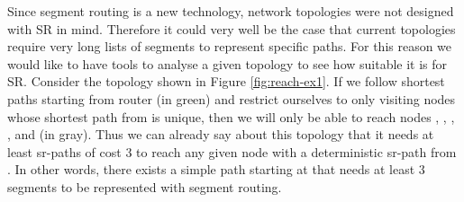 Since segment routing is a new technology, network topologies were not designed with SR in mind.
Therefore it could very well be the case that current topologies require very long lists of segments
to represent specific paths. For this reason we would like to have tools to analyse
a given topology to see how suitable it is for SR. Consider the topology shown in Figure \ref{fig:reach-ex1}.
If we follow shortest paths starting from router  (in green) and restrict ourselves to only visiting nodes
whose shortest path from  is unique, then we will only be able to reach nodes , ,
, ,  and  (in gray). Thus we can already say about this topology that
it needs at least sr-paths of cost $3$ to reach any given node with a deterministic sr-path from .
In other words, there exists a simple path starting at  that needs at least $3$ segments to be represented with
segment routing.


